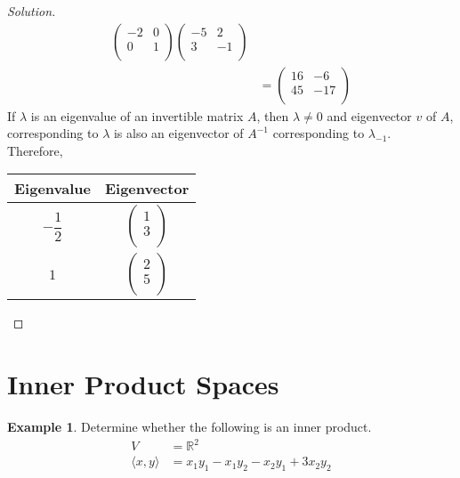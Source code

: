 \documentclass[fleqn, a4paper, 12pt]{article}
\theoremstyle{definition}
\newtheorem{example}{Example}
\theoremstyle{theorem}
\newenvironment{solution}
{\begin{proof}[Solution]\let\qed\relax}
	{\end{proof}}
\begin{document}
\begin{solution}
\begin{align*}
\begin{pmatrix}
				-2 & 0\\
				0 & 1\\
			\end{pmatrix}
			\begin{pmatrix}
				-5 & 2\\
				3 & -1\\
			\end{pmatrix}\\
		&=
			\begin{pmatrix}
				16 & -6\\
				45 & -17\\
			\end{pmatrix}
	\end{align*}
	If $\lambda$ is an eigenvalue of an invertible matrix $A$, then $\lambda \neq 0$ and eigenvector $v$ of $A$, corresponding to $\lambda$ is also an eigenvector of $A^{-1}$ corresponding to $\lambda_{-1}$.\\
	Therefore,
	\begin{tabular}{|c|c|}
		\hline
		Eigenvalue & Eigenvector\\
		\hline
		$-\dfrac{1}{2}$ & 
			$
				\begin{pmatrix}
					1\\
					3\\
				\end{pmatrix}
			$\\
		\hline
		$1$ & 
			$
				\begin{pmatrix}
					2\\
					5\\
				\end{pmatrix}
			$\\
		\hline
	\end{tabular}
\end{solution}

\section{Inner Product Spaces}

\begin{example}
	Determine whether the following is an inner product.
	\begin{align*}
		V &= \mathbb{R}^2\\
		\langle x, y \rangle &= x_1 y_1 - x_1 y_2 - x_2 y_1 + 3 x_2 y_2
	\end{align*}
\end{example}
\end{document}
